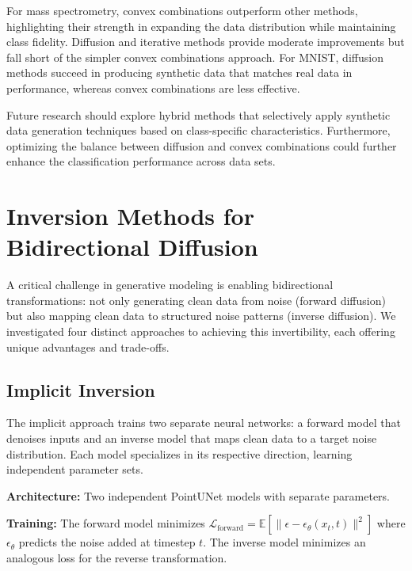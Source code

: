 \documentclass[sigconf]{acmart}
\begin{document}
For mass spectrometry, convex combinations outperform other methods, highlighting their strength in expanding the data distribution while maintaining class fidelity. Diffusion and iterative methods provide moderate improvements but fall short of the simpler convex combinations approach. For MNIST, diffusion methods succeed in producing synthetic data that matches real data in performance, whereas convex combinations are less effective.

Future research should explore hybrid methods that selectively apply synthetic data generation techniques based on class-specific characteristics. Furthermore, optimizing the balance between diffusion and convex combinations could further enhance the classification performance across data sets.

\section{Inversion Methods for Bidirectional Diffusion}

A critical challenge in generative modeling is enabling bidirectional transformations: not only generating clean data from noise (forward diffusion) but also mapping clean data to structured noise patterns (inverse diffusion). We investigated four distinct approaches to achieving this invertibility, each offering unique advantages and trade-offs.

\subsection{Implicit Inversion}

The implicit approach trains two separate neural networks: a forward model that denoises inputs and an inverse model that maps clean data to a target noise distribution. Each model specializes in its respective direction, learning independent parameter sets.

\textbf{Architecture:} Two independent PointUNet models with separate parameters.

\textbf{Training:} The forward model minimizes $\mathcal{L}_{\text{forward}} = \mathbb{E}[\|\epsilon - \epsilon_\theta(x_t, t)\|^2]$ where $\epsilon_\theta$ predicts the noise added at timestep $t$. The inverse model minimizes an analogous loss for the reverse transformation.
\end{document}
